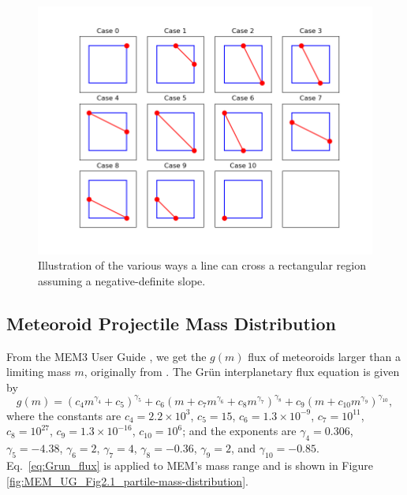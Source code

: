 \documentclass{hitec}
\numberwithin{equation}{section}
\begin{document}
\begin{figure}[h!]
	\centering
	\includegraphics[scale=0.65]{integration_bounds_cases.png}
	\caption{Illustration of the various ways a line can cross a rectangular region assuming a negative-definite slope.}\label{fig:integration_bounds_cases}
\end{figure}



\subsection{Meteoroid Projectile Mass Distribution}

From the MEM3 User Guide , we get the $g(m)$ flux of meteoroids larger than a limiting mass $m$, originally from \cite{grun1985collisional}. The Gr{\"u}n interplanetary flux equation is given by
\begin{equation}\label{eq:Grun_flux}
g(m) = (c_4m^{\gamma_4}+c_5)^{\gamma_5} + c_6(m + c_7m^{\gamma_6} + c_8m^{\gamma_7})^{\gamma_8} + c_9(m + c_{10}m^{\gamma_9})^{\gamma_{10}},
\end{equation}
where the constants are $c_4 = 2.2\times 10^3$, $c_5 = 15$, $c_6 = 1.3 \times 10^{-9}$, $c_7=10^{11}$, $c_8=10^{27}$, $c_9 = 1.3\times 10^{-16}$, $c_{10} = 10^6$; and the exponents are $\gamma_4 = 0.306$, $\gamma_5 = -4.38$, $\gamma_6 = 2$, $\gamma_7 = 4$, $\gamma_8 = -0.36$, $\gamma_{9} = 2$, and $\gamma_{10} = -0.85$. Eq.\ \ref{eq:Grun_flux} is applied to MEM's mass range and is shown in Figure \ref{fig:MEM_UG_Fig2.1_partile-mass-distribution}.
\end{document}
